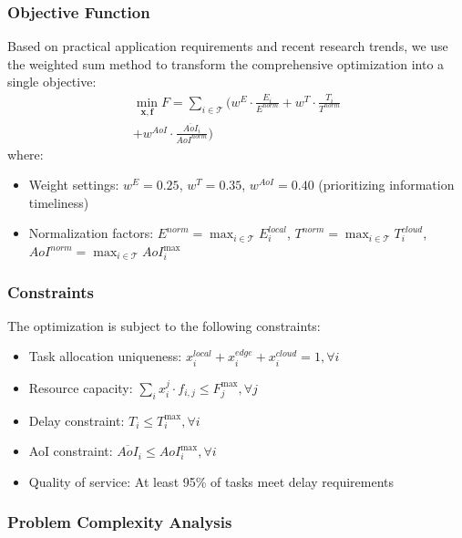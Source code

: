 \documentclass[conference]{IEEEtran}
\begin{document}
\subsubsection{Objective Function}
Based on practical application requirements and recent research trends, we use the weighted sum method to transform the comprehensive optimization into a single objective:
\begin{equation}
    \begin{split}
        \min_{\mathbf{x}, \mathbf{f}} F = \sum_{i \in \mathcal{T}} \bigg( w^E \cdot \frac{E_i}{E^{norm}} + w^T \cdot \frac{T_i}{T^{norm}}
        \\+ w^{AoI} \cdot \frac{\overline{AoI}_i}{AoI^{norm}} \bigg)
    \end{split}
\end{equation}
where:
\begin{itemize}
    \item Weight settings: $w^E = 0.25$, $w^T = 0.35$, $w^{AoI} = 0.40$ (prioritizing information timeliness)
    \item Normalization factors: $E^{norm} = \max_{i \in \mathcal{T}} E_i^{local}$, $T^{norm} = \max_{i \in \mathcal{T}} T_i^{cloud}$, $AoI^{norm} = \max_{i \in \mathcal{T}} AoI_i^{\max}$
\end{itemize}

\subsubsection{Constraints}
The optimization is subject to the following constraints:
\begin{itemize}
    \item[a.] Task allocation uniqueness: $x_{i}^{local} + x_{i}^{edge} + x_{i}^{cloud} = 1, \forall i$
    \item[b.] Resource capacity: $\sum_{i} x_{i}^{j} \cdot f_{i,j} \leq F_{j}^{\max}, \forall j$
    \item[c.] Delay constraint: $T_i \leq T_i^{\max}, \forall i$
    \item[d.] AoI constraint: $\overline{AoI}_i \leq AoI_i^{\max}, \forall i$
    \item[e.] Quality of service: At least 95\% of tasks meet delay requirements
\end{itemize}

\subsubsection{Problem Complexity Analysis}
\end{document}
